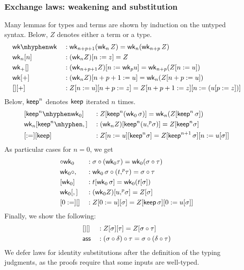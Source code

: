   \subsubsection{Exchange laws: weakening and substitution}
  Many lemmas for types and terms are shown by induction on the untyped syntax.
  Below, $Z$ denotes either a term or a type.
\begin{alignat*}{5}
  & \wk\mhyphen\wk && : \wk_{n+p+1} (\wk_n\,Z) = \wk_n(\wk_{n+p}\,Z)\\
  & \wk_n[n] && : (\wk_{n} Z)[ n := z] = Z \\
  & \wk_+[] && : (\wk_{n+p+1} Z)[ n := \wk_p u] = \wk_{n+p}(Z[n := u]) \\
  & \wk[+] && : (\wk_{n} Z)[ n+p+1 :=  u] = \wk_{n}(Z[n+p := u]) \\
  & [][+] && : Z[n :=u][n+p:=z] = Z[n+p+1:=z][n:= (u[p:=z])]
  \end{alignat*}
  Below, $\mathsf{keep}^n$ denotes $\mathsf{keep}$ iterated $n$ times.
\begin{alignat*}{5}
  & [\keep^n\mhyphen \wkO] && : Z[\keep^n (\wkO\,\sigma)] = \wk_n (Z[\keep^n\,\sigma])
  \\
  & \wk_n[\keep^n\mhyphen\cons]  & &
  :
  (\wk_n Z) [\keep^n (u \consu \sigma)] = Z [ \keep^n \sigma]
  \\
   & [:=][\keep] && : Z [ n:= u][\keep^n \sigma] =  Z[\keep^{n+1}\,\sigma][n := u[\sigma]]
  \end{alignat*}
As particular cases for $n=0$, we get
\begin{alignat*}{5}
  & {}{\circ}{}\mathsf{wk}_0 & & : \sigma \circ (\mathsf{wk}_0 \tau) = \mathsf{wk}_0 (\sigma \circ \tau) \\
  & \mathsf{wk}_0{}{\circ}{}, && : \mathsf{wk}_0\,\sigma \circ (t {,}^p \tau ) = \sigma \circ \tau \\
  & [\mathsf{wk}_0] && : t[\mathsf{wk}_0\,\sigma] = \mathsf{wk}_0 (t[\sigma]) \\
  & \mathsf{wk}_0[,] && : (\mathsf{wk}_0 Z)[u {,}^p \sigma] = Z[\sigma] \\
  & [0:=][] && : Z [ 0:= u][ \sigma] =  Z[\mathsf{keep}\,\sigma][0 := u[\sigma]]
\end{alignat*}
Finally, we show the following:
\begin{alignat*}{5}
  & [][] && : Z[\sigma][\tau] = Z[\sigma\circ\tau]
  \\
  & \mathsf{ass} && : (\sigma\circ \delta)\circ\tau = \sigma\circ (\delta\circ\tau)
  \end{alignat*}
We defer laws for identity substitutions after the definition of the typing
judgments, as the proofs require that some inputs are well-typed.

